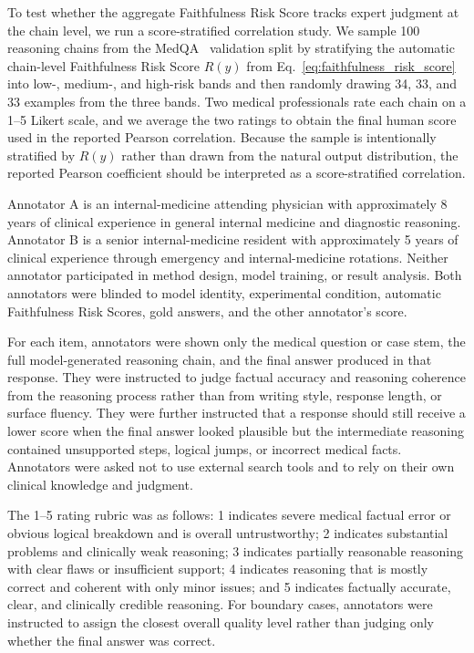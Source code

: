 \documentclass[a4paper,fleqn,doubleblind]{cas-sc}
\begin{document}
To test whether the aggregate Faithfulness Risk Score tracks expert judgment at the chain level, we run a score-stratified correlation study. We sample 100 reasoning chains from the MedQA~\cite{jin2021disease} validation split by stratifying the automatic chain-level Faithfulness Risk Score $R(y)$ from Eq.~\ref{eq:faithfulness_risk_score} into low-, medium-, and high-risk bands and then randomly drawing 34, 33, and 33 examples from the three bands. Two medical professionals rate each chain on a 1--5 Likert scale, and we average the two ratings to obtain the final human score used in the reported Pearson correlation. Because the sample is intentionally stratified by $R(y)$ rather than drawn from the natural output distribution, the reported Pearson coefficient should be interpreted as a score-stratified correlation.

Annotator A is an internal-medicine attending physician with approximately 8 years of clinical experience in general internal medicine and diagnostic reasoning. Annotator B is a senior internal-medicine resident with approximately 5 years of clinical experience through emergency and internal-medicine rotations. Neither annotator participated in method design, model training, or result analysis. Both annotators were blinded to model identity, experimental condition, automatic Faithfulness Risk Scores, gold answers, and the other annotator's score.

For each item, annotators were shown only the medical question or case stem, the full model-generated reasoning chain, and the final answer produced in that response. They were instructed to judge factual accuracy and reasoning coherence from the reasoning process rather than from writing style, response length, or surface fluency. They were further instructed that a response should still receive a lower score when the final answer looked plausible but the intermediate reasoning contained unsupported steps, logical jumps, or incorrect medical facts. Annotators were asked not to use external search tools and to rely on their own clinical knowledge and judgment.

The 1--5 rating rubric was as follows: 1 indicates severe medical factual error or obvious logical breakdown and is overall untrustworthy; 2 indicates substantial problems and clinically weak reasoning; 3 indicates partially reasonable reasoning with clear flaws or insufficient support; 4 indicates reasoning that is mostly correct and coherent with only minor issues; and 5 indicates factually accurate, clear, and clinically credible reasoning. For boundary cases, annotators were instructed to assign the closest overall quality level rather than judging only whether the final answer was correct.
\end{document}
